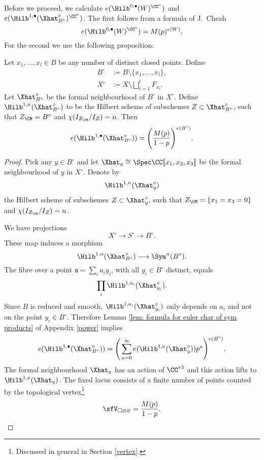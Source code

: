 Before we proceed, we calculate $e(\Hilb^{0,\bullet}(W)^{\CC^*})$ and $e(\Hilb^{1,\bullet}(\Xhat ^{\circ}_{B^{\circ}})^{\CC^*})$. The first follows from a formula of J.~Cheah \cite{Cheah} 
\begin{equation} \label{Cheah}
e(\Hilb^{0,\bullet}(W)^{\CC^*}) = M(p)^{e(W)}.
\end{equation}
For the second we use the following proposition:
\begin{proposition} \label{section}
Let $x_1, \ldots, x_l \in B$ be any number of distinct closed points. Define 
\begin{align*}
B^\circ &:= B \setminus \{x_1, \ldots, x_l\}, \\
X^\circ &:= X \setminus \bigsqcup_{i=1}^{l} F_{x_i}.
\end{align*} 
Let $\Xhat ^{\circ}_{B^{\circ}}$ be the formal neighbourhood of $B^\circ$ in $X^\circ$. Define $\Hilb^{1,n}(\Xhat ^{\circ}_{B^{\circ}})$ to be the Hilbert scheme of subschemes $Z \subset \Xhat ^{\circ}_{B^{\circ}}$, such that $Z_{\CM} = B^\circ$ and $\chi(I_{Z_{\CM}} / I_Z) = n$.
Then
$$
e(\Hilb^{1,\bullet}(\Xhat ^{\circ}_{B^{\circ}})) = \Bigg( \frac{M(p)}{1-p} \Bigg)^{e(B^\circ)}.
$$
\end{proposition}
\begin{proof}
Pick any $y \in B^\circ$ and let $\Xhat _{y} \cong \Spec \CC [\![x_1,x_2,x_3]\!]$ be the formal neighbourhood of $y$ in $X^\circ$. Denote by $$\Hilb^{1,n}(\Xhat ^{\circ}_{y})$$ the Hilbert scheme of subschemes $Z \subset \Xhat _{y}^{\circ}$, such that $Z_{\CM} = \{x_1=x_3=0\}$ and $\chi(I_{Z_{\CM}} / I_Z) = n$. 

We have projections
$$
X^\circ \longrightarrow S^\circ \longrightarrow B^\circ.
$$
These map induces a morphism
$$
\Hilb^{1,n}(\Xhat ^{\circ}_{B^{\circ}}) \longrightarrow \Sym^n(B^\circ).
$$
The fibre over a point $\mathfrak{a} = \sum_i a_i y_i$, with all $y_i \in B^\circ$ distinct, equals
$$
\prod_{i} \Hilb^{1,a_i}(\Xhat _{y_i}^{\circ}).
$$
Since $B$ is reduced and smooth, $\Hilb^{1,a_i}(\Xhat _{y_i}^{\circ})$ only depends on $a_i$ and not on the point $y_i \in B^\circ$. Therefore Lemma \ref{lem: formula for euler char of sym products} of Appendix \ref{power} implies
$$
e(\Hilb^{1,\bullet}(\Xhat ^{\circ}_{B^{\circ}})) = \Bigg( \sum_{a=0}^{\infty} e(\Hilb^{1,a}(\Xhat _{y}^{\circ})) p^a \Bigg)^{e(B^\circ)}.
$$
The formal neighbourhood $\Xhat _{y}$ has an action of $\CC^{*3}$ and this action lifts to $\Hilb^{1,a}(\Xhat _{y})$. The fixed locus consists of a finite number of points counted by the topological vertex\footnote{Discussed in general in Section \ref{vertex}.}
\begin{equation*}
\sfV_{\square\varnothing\varnothing} = \frac{M(p)}{1-p}. \qedhere
\end{equation*}
\end{proof}

